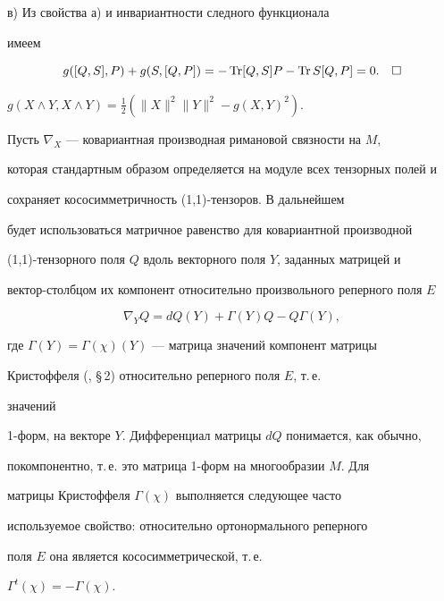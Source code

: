 в) Из свойства а) и инвариантности следного функционала


имеем


$$


g([Q,S],P)+g(S,[Q,P])=-\Tr [Q,S]P-\Tr S[Q,P]=0.\quad\square


$$





\begin{cors} $g(X\land Y,X\land Y)=\frac12 (\| X\| ^2


\| Y\| ^2-g(X,Y)^2)$.


\end{cors}





Пусть $\nabla_X$ --- ковариантная производная римановой связности на $M$,


которая стандартным образом определяется на модуле всех тензорных полей и


сохраняет кососимметричность (1,1)-тензоров. В дальнейшем


будет использоваться матричное равенство для ковариантной производной


(1,1)-тензорного поля $Q$ вдоль векторного поля $Y$, заданных матрицей и


вектор-столбцом их компонент относительно произвольного реперного поля $E$


\begin{equation}


\nabla_YQ=dQ(Y)+\Gamma (Y)Q-Q\Gamma (Y),


\end{equation}


где $\Gamma (Y)=\Gamma (\chi )(Y)$ --- матрица значений компонент матрицы


Кристоффеля (\cite{Far1}, \S\,2) относительно реперного поля $E$, т.\,е.


значений


1-форм, на векторе $Y$. Дифференциал матрицы $dQ$ понимается, как обычно,


покомпонентно, т.\,е. это матрица 1-форм на многообразии $M$. Для


матрицы Кристоффеля $\Gamma(\chi)$ выполняется следующее часто


используемое свойство: относительно ортонормального реперного


поля $E$ она является кососимметрической, т.\,е.


$\Gamma^t(\chi)=-\Gamma(\chi)$.





